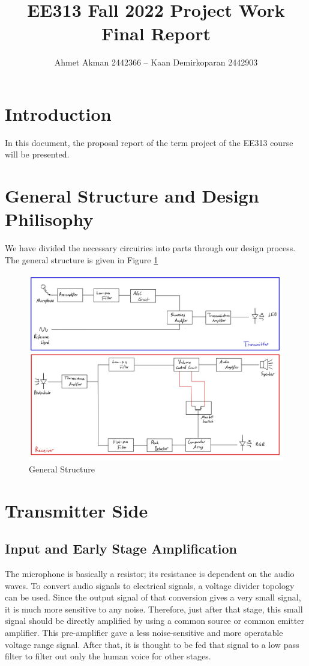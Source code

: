 \documentclass[a4paper,10pt]{IEEEtran}
\title{  EE313 Fall 2022 Project Work  \protect\\ Final Report}
\author{ Ahmet Akman 2442366 -- Kaan Demirkoparan 2442903 }
\date{}
\begin{document}
\thispagestyle{empty}


\maketitle

\section{Introduction}
In this document, the proposal report of the term project of the EE313 course will be presented. 
\section{General Structure and Design Philisophy}
We have divided the necessary circuiries into parts through our design process. The general structure is given in Figure \ref*{general}
\begin{figure}[htbp!]
    \centering
    \includegraphics[width = 1\linewidth]{general_structure.jpeg}
    \caption{General Structure}
    \label{general}
\end{figure} 
\section{Transmitter Side}
\subsection{Input and Early Stage Amplification}
The microphone is basically a resistor; its resistance is dependent on the audio waves. To convert audio signals to electrical signals, a voltage divider topology can be used. Since the output signal of that conversion gives a very small signal, it is much more sensitive to any noise. Therefore, just after that stage, this small signal should be directly amplified by using a common source or common emitter amplifier. This pre-amplifier gave a less noise-sensitive and more operatable voltage range signal. After that, it is thought to be fed that signal to a low pass filter to filter out only the human voice for other stages. 
\end{document}
